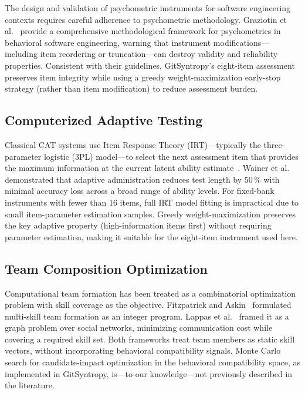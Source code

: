 \documentclass[conference]{IEEEtran}
\begin{document}
The design and validation of psychometric instruments for software
engineering contexts requires careful adherence to psychometric
methodology.  Graziotin et al.~\cite{graziotin2021} provide a
comprehensive methodological framework for psychometrics in
behavioral software engineering, warning that instrument
modifications---including item reordering or truncation---can
destroy validity and reliability properties.  Consistent with their
guidelines, GitSyntropy's eight-item assessment preserves item
integrity while using a greedy weight-maximization early-stop
strategy (rather than item modification) to reduce assessment
burden.

\subsection{Computerized Adaptive Testing}

Classical CAT systems use Item Response Theory (IRT)---typically the
three-parameter logistic (3PL) model---to select the next assessment
item that provides the maximum information at the current latent
ability estimate~\cite{vanderlinden2000}.  Wainer et al.~\cite{wainer2000}
demonstrated that adaptive administration reduces test length by
50\,\% with minimal accuracy loss across a broad range of ability
levels.  For fixed-bank instruments with fewer than 16 items, full
IRT model fitting is impractical due to small item-parameter
estimation samples.  Greedy weight-maximization preserves the key
adaptive property (high-information items first) without requiring
parameter estimation, making it suitable for the eight-item
instrument used here.

\subsection{Team Composition Optimization}

Computational team formation has been treated as a combinatorial
optimization problem with skill coverage as the objective.
Fitzpatrick and Askin~\cite{fitzpatrick2005} formulated multi-skill
team formation as an integer program.  Lappas et al.~\cite{lappas2009}
framed it as a graph problem over social networks, minimizing
communication cost while covering a required skill set.  Both
frameworks treat team members as static skill vectors, without
incorporating behavioral compatibility signals.  Monte Carlo
search for candidate-impact optimization in the behavioral compatibility
space, as implemented in GitSyntropy, is---to our
knowledge---not previously described in the literature.
\end{document}
